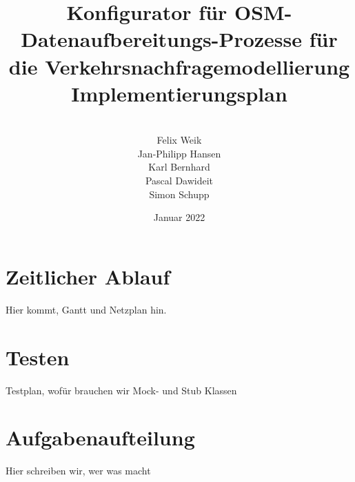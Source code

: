 \documentclass[parskip=full]{scrartcl} %
\title{Konfigurator für OSM-Datenaufbereitungs-Prozesse für die Verkehrsnachfragemodellierung \\ \vspace{2mm}\large{}Implementierungsplan}
\author{
\vspace{5mm}\\
Felix Weik\\ Jan-Philipp Hansen\\ Karl Bernhard\\ Pascal Dawideit\\ Simon Schupp}
\date{Januar 2022}
\begin{document}
\maketitle
\newpage

\tableofcontents
\newpage


\section{Zeitlicher Ablauf}
Hier kommt, Gantt und Netzplan hin.




\section{Testen}
Testplan, wofür brauchen wir Mock- und Stub Klassen




\section{Aufgabenaufteilung}
Hier schreiben wir, wer was macht
\end{document}
